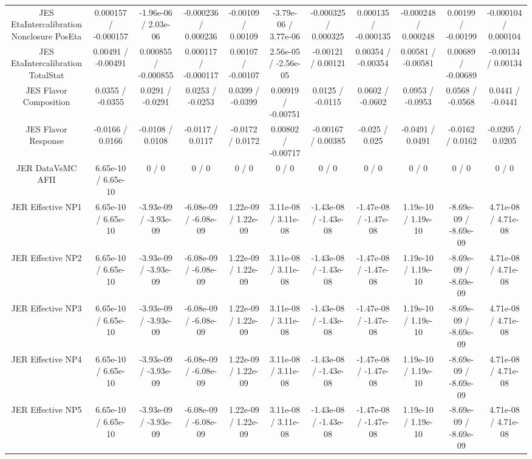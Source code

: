 \begin{table}[htbp]
\begin{center}
\begin{tabular}{|c|c|c|c|c|c|c|c|c|c|c|}
  JES EtaIntercalibration Nonclosure PosEta & 0.000157 / -0.000157 & -1.96e-06 / 2.03e-06 & -0.000236 / 0.000236 & -0.00109 / 0.00109 & -3.79e-06 / 3.77e-06 & -0.000325 / 0.000325 & 0.000135 / -0.000135 & -0.000248 / 0.000248 & 0.00199 / -0.00199 & -0.000104 / 0.000104 \\ 
  JES EtaIntercalibration TotalStat & 0.00491 / -0.00491 & 0.000855 / -0.000855 & 0.000117 / -0.000117 & 0.00107 / -0.00107 & 2.56e-05 / -2.56e-05 & -0.00121 / 0.00121 & 0.00354 / -0.00354 & 0.00581 / -0.00581 & 0.00689 / -0.00689 & -0.00134 / 0.00134 \\ 
  JES Flavor Composition & 0.0355 / -0.0355 & 0.0291 / -0.0291 & 0.0253 / -0.0253 & 0.0399 / -0.0399 & 0.00919 / -0.00751 & 0.0125 / -0.0115 & 0.0602 / -0.0602 & 0.0953 / -0.0953 & 0.0568 / -0.0568 & 0.0441 / -0.0441 \\ 
  JES Flavor Response & -0.0166 / 0.0166 & -0.0108 / 0.0108 & -0.0117 / 0.0117 & -0.0172 / 0.0172 & 0.00802 / -0.00717 & -0.00167 / 0.00385 & -0.025 / 0.025 & -0.0491 / 0.0491 & -0.0162 / 0.0162 & -0.0205 / 0.0205 \\ 
  JER DataVsMC AFII & 6.65e-10 / 6.65e-10 & 0 / 0 & 0 / 0 & 0 / 0 & 0 / 0 & 0 / 0 & 0 / 0 & 0 / 0 & 0 / 0 & 0 / 0 \\ 
  JER Effective NP1 & 6.65e-10 / 6.65e-10 & -3.93e-09 / -3.93e-09 & -6.08e-09 / -6.08e-09 & 1.22e-09 / 1.22e-09 & 3.11e-08 / 3.11e-08 & -1.43e-08 / -1.43e-08 & -1.47e-08 / -1.47e-08 & 1.19e-10 / 1.19e-10 & -8.69e-09 / -8.69e-09 & 4.71e-08 / 4.71e-08 \\ 
  JER Effective NP2 & 6.65e-10 / 6.65e-10 & -3.93e-09 / -3.93e-09 & -6.08e-09 / -6.08e-09 & 1.22e-09 / 1.22e-09 & 3.11e-08 / 3.11e-08 & -1.43e-08 / -1.43e-08 & -1.47e-08 / -1.47e-08 & 1.19e-10 / 1.19e-10 & -8.69e-09 / -8.69e-09 & 4.71e-08 / 4.71e-08 \\ 
  JER Effective NP3 & 6.65e-10 / 6.65e-10 & -3.93e-09 / -3.93e-09 & -6.08e-09 / -6.08e-09 & 1.22e-09 / 1.22e-09 & 3.11e-08 / 3.11e-08 & -1.43e-08 / -1.43e-08 & -1.47e-08 / -1.47e-08 & 1.19e-10 / 1.19e-10 & -8.69e-09 / -8.69e-09 & 4.71e-08 / 4.71e-08 \\ 
  JER Effective NP4 & 6.65e-10 / 6.65e-10 & -3.93e-09 / -3.93e-09 & -6.08e-09 / -6.08e-09 & 1.22e-09 / 1.22e-09 & 3.11e-08 / 3.11e-08 & -1.43e-08 / -1.43e-08 & -1.47e-08 / -1.47e-08 & 1.19e-10 / 1.19e-10 & -8.69e-09 / -8.69e-09 & 4.71e-08 / 4.71e-08 \\ 
  JER Effective NP5 & 6.65e-10 / 6.65e-10 & -3.93e-09 / -3.93e-09 & -6.08e-09 / -6.08e-09 & 1.22e-09 / 1.22e-09 & 3.11e-08 / 3.11e-08 & -1.43e-08 / -1.43e-08 & -1.47e-08 / -1.47e-08 & 1.19e-10 / 1.19e-10 & -8.69e-09 / -8.69e-09 & 4.71e-08 / 4.71e-08 \\ 

\end{tabular}
\end{center}
\end{table}

